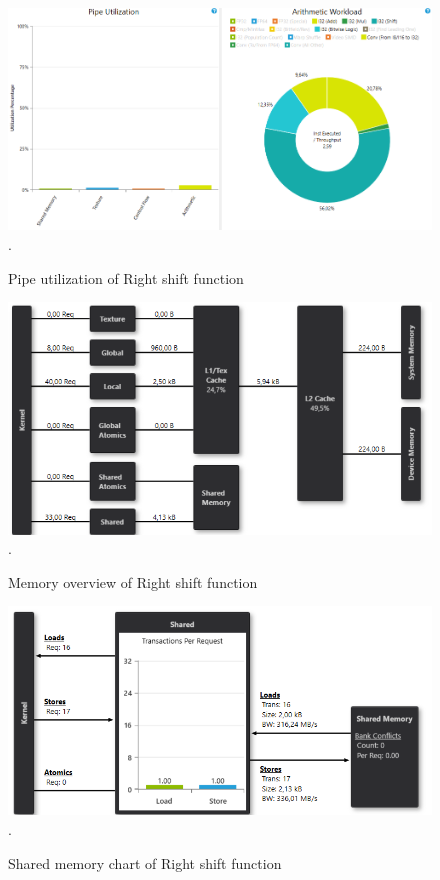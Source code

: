 \documentclass[oneside,openright,12pt,final,en]{mgr}
\begin{document}
\begin{figure}[H]
	\centering
	\includegraphics[width=\textwidth]{rightshift_pipe}.
	\caption{Pipe utilization of Right shift function}
	\label{fig:rightshift_pipe}
\end{figure}

\begin{figure}[H]
	\centering
	\includegraphics[width=\textwidth]{rightshift_memory}.
	\caption{Memory overview of Right shift function}
	\label{fig:rightshift_memory}
\end{figure}

\begin{figure}[H]
	\centering
	\includegraphics[width=\textwidth]{rightshift_shared}.
	\caption{Shared memory chart of Right shift function}
	\label{fig:rightshift_shared}
\end{figure}



 \listoffigures
 \listoftables
\end{document}

